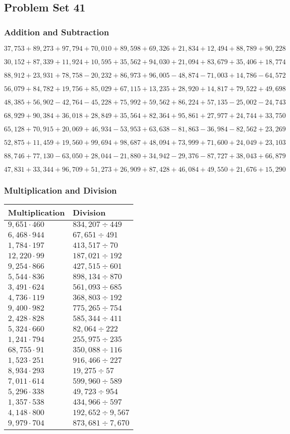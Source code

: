 \hypertarget{problem-set-41-4}{%
\subsection{Problem Set 41}\label{problem-set-41-4}}

\hypertarget{addition-and-subtraction-263}{%
\subsubsection{Addition and
Subtraction}\label{addition-and-subtraction-263}}

\(37,753+89,273+97,794+70,010+89,598+69,326+21,834+12,494+88,789+ 90,228\)

\(30,152+87,339+11,924+10,595+35,562+94,030+21,094+83,679+35,406+18,774\)

\(88,912+23,931+78,758-20,232+86,973+96,005-48,874-71,003+14,786-64,572\)

\(56,079+84,782+19,756+85,029+67,115+13,235+28,920+14,817+79,522+49,698\)

\(48,385+56,902-42,764-45,228+75,992+59,562+86,224+57,135-25,002-24,743\)

\(68,929+90,384+36,018+28,849+35,564+82,364+95,861+27,977+24,744+33,750\)

\(65,128+70,915+20,069+46,934-53,953+63,638-81,863-36,984-82,562+23,269\)

\(52,875+11,459+19,560+99,694+98,687+48,094+73,999+71,600+24,049+23,103\)

\(88,746+77,130-63,050+28,044-21,880+34,942-29,376-87,727+38,043+66,879\)

\(47,831+33,344+96,709+51,273+26,909+87,428+46,084+49,550+21,676+15,290\)

\hypertarget{multiplication-and-division-262}{%
\subsubsection{Multiplication and
Division}\label{multiplication-and-division-262}}

\begin{longtable}[]{@{}ll@{}}
\toprule
Multiplication & Division\tabularnewline
\midrule
\endhead
\(9,651\cdot460\) & \(834,207÷449\)\tabularnewline
\(6,468\cdot944\) & \(67,651÷491\)\tabularnewline
\(1,784\cdot197\) & \(413,517 ÷70\)\tabularnewline
\(12,220\cdot99\) & \(187,021÷192\)\tabularnewline
\(9,254\cdot866\) & \(427,515÷601\)\tabularnewline
\(5,544\cdot836\) & \(898,134÷870\)\tabularnewline
\(3,491\cdot624\) & \(561,093÷685\)\tabularnewline
\(4,736\cdot119\) & \(368,803÷192\)\tabularnewline
\(9,400\cdot982\) & \(775,265÷754\)\tabularnewline
\(2,428\cdot828\) & \(585,344÷411\)\tabularnewline
\(5,324\cdot660\) & \(82,064÷222\)\tabularnewline
\(1,241\cdot794\) & \(255,975÷235\)\tabularnewline
\(68,755\cdot91\) & \(350,088÷116\)\tabularnewline
\(1,523\cdot251\) & \(916,466÷227\)\tabularnewline
\(8,934\cdot293\) & \(19,275÷57\)\tabularnewline
\(7,011\cdot614\) & \(599,960÷589\)\tabularnewline
\(5,296\cdot338\) & \(49,723÷954\)\tabularnewline
\(1,357\cdot538\) & \(434,966÷597\)\tabularnewline
\(4,148\cdot800\) & \(192,652÷9,567\)\tabularnewline
\(9,979\cdot704\) & \(873,681÷7,670\)\tabularnewline
\bottomrule
\end{longtable}

